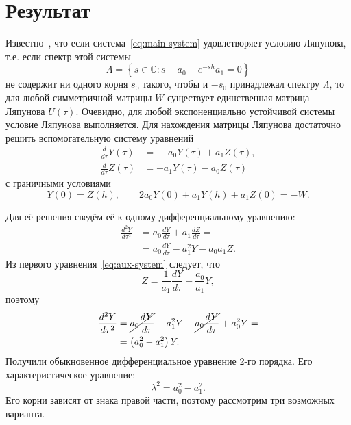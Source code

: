\documentclass[a4paper,14pt]{article}
\begin{document}
\section{Результат}

Известно~\cite[стр.~51]{kharitonov2013}, что если система~\eqref{eq:main-system}
удовлетворяет условию Ляпунова, т.е. если спектр этой системы
\begin{equation*}
  \Lambda = \left\{ s \in \mathbb{C}: s - a_0 - e^{-sh} a_1 = 0 \right\}
\end{equation*}
не содержит ни одного корня $s_0$ такого, чтобы и $-s_0$ принадлежал спектру
$\Lambda$, то для любой симметричной матрицы $W$ существует единственная матрица
Ляпунова $U(\tau)$. Очевидно, для любой экспоненциально устойчивой системы
условие Ляпунова выполняется. Для нахождения матрицы Ляпунова достаточно решить
вспомогательную систему уравнений
\begin{equation}
  \label{eq:aux-system}
  \begin{aligned}
    \frac{d }{d \tau} Y(\tau) &= \phantom{-}a_0 Y(\tau) + a_1 Z(\tau), \\
    \frac{d }{d \tau} Z(\tau) &= -a_1 Y(\tau) - a_0 Z(\tau)
  \end{aligned}
\end{equation}
с граничными условиями
\begin{equation}
  \label{eq:aux-boundaries}
  Y(0) = Z(h),
  \qquad
  2 a_0 Y(0) + a_1 Y(h) + a_1 Z(0) = -W.
\end{equation}

Для её решения сведём её к одному дифференциальному уравнению:
\begin{equation*}
  \begin{aligned}
    \frac{d^2 Y}{d \tau^2}
    &=
      a_0 \frac{d Y}{d \tau} + a_1 \frac{d Z}{d \tau} = \\
    &=
      a_0 \frac{d Y}{d \tau} - a_1^2 Y - a_0 a_1 Z.
  \end{aligned}
\end{equation*}
Из первого уравнения~\eqref{eq:aux-system} следует, что
\begin{equation*}
  Z = \frac{1}{a_1} \frac{d Y}{d \tau} - \frac{a_0}{a_1} Y,
\end{equation*}
поэтому
\begin{equation}
  \label{eq:aux-eq}
  \begin{aligned}
    \frac{d^2 Y}{d \tau^2}
    &= \cancel{a_0 \frac{d Y}{d \tau}} - a_1^2 Y
      - \cancel{a_0 \frac{d Y}{d \tau}} + a_0^2 Y = \\
    &= \left( a_0^2 - a_1^2 \right) Y.
  \end{aligned}
\end{equation}
Получили обыкновенное дифференциальное уравнение 2-го порядка. Его
характеристическое уравнение:
\begin{equation}
  \label{eq:aux-char}
  \lambda^2 = a_0^2 - a_1^2.
\end{equation}
Его корни зависят от знака правой части, поэтому рассмотрим три
возможных варианта.
\end{document}
